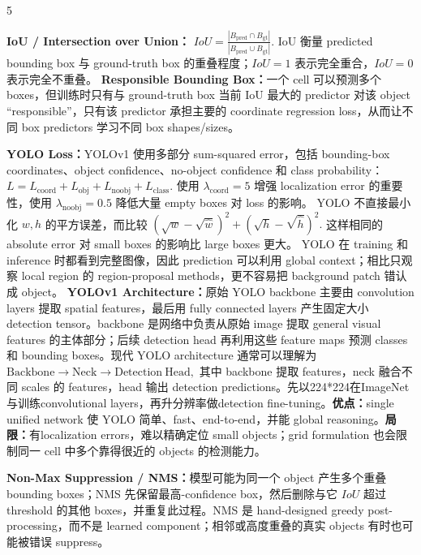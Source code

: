 \documentclass[a4paper, landscape]{article}
\begin{document}
\begin{multicols}{5}
\par \textbf{IoU / Intersection over Union：}
\(
IoU=\frac{|B_{\mathrm{pred}}\cap B_{\mathrm{gt}}|}
{|B_{\mathrm{pred}}\cup B_{\mathrm{gt}}|}.
\)
IoU 衡量 predicted bounding box 与 ground-truth box 的重叠程度；\(IoU=1\) 表示完全重合，\(IoU=0\) 表示完全不重叠。
\textbf{Responsible Bounding Box：}一个 cell 可以预测多个 boxes，但训练时只有与 ground-truth box 当前 IoU 最大的 predictor 对该 object ``responsible''，只有该 predictor 承担主要的 coordinate regression loss，从而让不同 box predictors 学习不同 box shapes/sizes。

\par \textbf{YOLO Loss：}YOLOv1 使用多部分 sum-squared error，包括 bounding-box coordinates、object confidence、no-object confidence 和 class probability：
\(
L=L_{\mathrm{coord}}+L_{\mathrm{obj}}+L_{\mathrm{noobj}}+L_{\mathrm{class}}.
\)
使用 \(\lambda_{\mathrm{coord}}=5\) 增强 localization error 的重要性，使用 \(\lambda_{\mathrm{noobj}}=0.5\) 降低大量 empty boxes 对 loss 的影响。
YOLO 不直接最小化 \(w,h\) 的平方误差，而比较
\(
(\sqrt w-\sqrt{\hat w})^2+
(\sqrt h-\sqrt{\hat h})^2.
\)
这样相同的 absolute error 对 small boxes 的影响比 large boxes 更大。
YOLO 在 training 和 inference 时都看到完整图像，因此 prediction 可以利用 global context；相比只观察 local region 的 region-proposal methods，更不容易把 background patch 错认成 object。
\textbf{YOLOv1 Architecture：}原始 YOLO backbone 主要由 convolution layers 提取 spatial features，最后用 fully connected layers 产生固定大小 detection tensor。backbone 是网络中负责从原始 image 提取 general visual features 的主体部分；后续 detection head 再利用这些 feature maps 预测 classes 和 bounding boxes。现代 YOLO architecture 通常可以理解为
\(
\mathrm{Backbone}\rightarrow\mathrm{Neck}\rightarrow\mathrm{Detection\ Head},
\)
其中 backbone 提取 features，neck 融合不同 scales 的 features，head 输出 detection predictions。先以224*224在ImageNet与训练convolutional layers，再升分辨率做detection fine-tuning。\textbf{优点：}single unified network 使 YOLO 简单、fast、end-to-end，并能 global reasoning。\textbf{局限：}有localization errors，难以精确定位 small objects；grid formulation 也会限制同一 cell 中多个靠得很近的 objects 的检测能力。

\par \textbf{Non-Max Suppression / NMS：}模型可能为同一个 object 产生多个重叠 bounding boxes；NMS 先保留最高-confidence box，然后删除与它 \(IoU\) 超过 threshold 的其他 boxes，并重复此过程。NMS 是 hand-designed greedy post-processing，而不是 learned component；相邻或高度重叠的真实 objects 有时也可能被错误 suppress。


\end{multicols}
\end{document}

